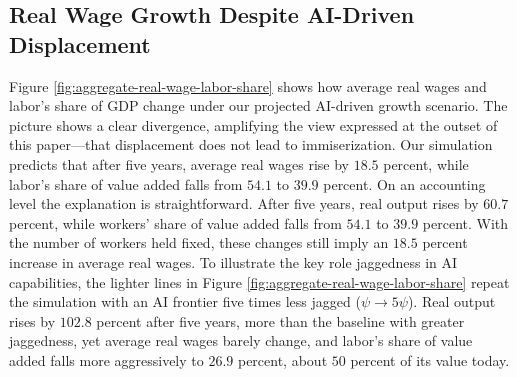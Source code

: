 \documentclass[11pt]{article}
\begin{document}
\subsection{Real Wage Growth Despite AI-Driven Displacement}

Figure \ref{fig:aggregate-real-wage-labor-share} shows how average
real wages and labor's share of GDP change under our projected AI-driven
growth scenario. The picture shows a clear divergence, amplifying
the view expressed at the outset of this paper---that displacement does
not lead to immiserization. Our simulation predicts that after five
years, average real wages rise by $18.5$
percent, while labor's share of value added falls from $54.1$
to $39.9$ percent. On an
accounting level the explanation is straightforward. After five years,
real output rises by $60.7$
percent, while workers' share of value added falls from $54.1$
to $39.9$ percent. With the
number of workers held fixed, these changes still imply an $18.5$
percent increase in average real wages. To illustrate the key role
jaggedness in AI capabilities, the lighter lines in Figure \ref{fig:aggregate-real-wage-labor-share}
repeat the simulation with an AI frontier five times less jagged ($\psi\rightarrow5\psi$).
Real output rises by $102.8$ percent
after five years, more than the baseline with greater jaggedness,
yet average real wages barely change, and labor's share of value added
falls more aggressively to $26.9$
percent, about $50$ percent
of its value today.
\end{document}
